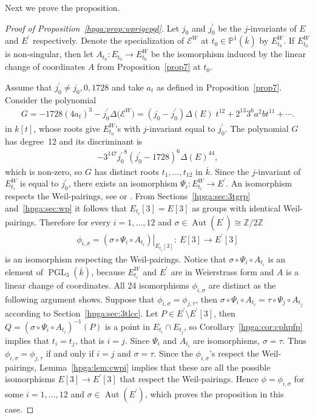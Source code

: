 \documentclass[pdftex]{sigma}
\newcommand{\mpp}{{\mathbb{P}}}
\newcommand{\mzz}{{\mathbb{Z}}}
\newcommand{\msetp}[1]{{\left({#1}\right)}}					%
\newcommand{\msets}[1]{{\left[{#1}\right]}}					%
\newcommand{\maut}[1]{\operatorname{Aut}\msetp{#1}}			%
\newcommand{\mac}[1]{{\overline{#1}}}
\newcommand{\mpgl}[2]{{\operatorname{PGL}_{#1}}\msetp{#2}}	%
\newcommand{\mps}[2]{{\mpp^{#1}\msetp{#2}}}						%
\newcommand{\mres}[2]{{\left.{#1}\right|_{#2}}}					%
\numberwithin{equation}{section}
\begin{document}
Next we prove the proposition.

\begin{proof}[Proof of Proposition~\ref{hpga:prop:wprigepgl}] Let $j_0$ and $j_0^\prime$ be the $j$-invariants of $E$ and $E^\prime$ respectively. Denote the specialization of $\mathcal{E}^W$ at $t_0\in\mps{1}{\mac {k}}$ by $E_{t_0}^W$. If $E_{t_0}^W$ is non-singular, then let $A_{t_0}\colon E_{t_0} \rightarrow E_{t_0}^W$ be the isomorphism induced by the linear change of coordinates $A$ from Proposition~\ref{prop7} at $t_0$.

Assume that $j_0^\prime\neq j_0,0,1728$ and take $a_t$ as defined in Proposition~\ref{prop7}. Consider the polynomial
\begin{gather*}
G=-1728\msetp{4a_t}^3-j_0^\prime \Delta\big(\mathcal{E}^W\big) =\msetp{j_0-j_0^\prime}\Delta\msetp{E}\;t^{12}+2^{13}3^6a^2b t^{11}+\cdots.
\end{gather*}
in $k\msets{t}$, whose roots give $E_{t_0}^W$'s with $j$-invariant equal to $j_0^\prime$. The polynomial $G$ has degree~12 and its discriminant is
\begin{gather*}
-3^{147}{j_0^\prime}^8\msetp{j_0^\prime-1728}^6\Delta\msetp{E}^{44},
\end{gather*}
which is non-zero, so $G$ has distinct roots $t_1,\ldots,t_{12}$ in $\mac{k}$. Since the $j$-invariant of $E_{t_i}^W$ is equal to $j_0^\prime$, there exists an isomorphism $\Psi_i\colon E_{t_i}^W\rightarrow E^\prime$. An isomorphism respects the Weil-pairings, see \cite[Proposition~III.8.2]{silverman1985} or \cite[Theorem~3.9]{washington2008}. From Sections~\ref{hpga:sec:3tgrp} and~\ref{hpga:sec:wp} it follows that $E_{t_i} \msets{3}=E\msets{3}$ as groups with identical Weil-pairings. Therefore for every $i=1,\ldots,12$ and $\sigma\in\maut{E^\prime}\cong\mzz/2\mzz$
\begin{gather*}
\phi_{i,\sigma} =\mres{\msetp{\sigma\circ\Psi_i\circ A_{t_i}}}{E_{t_i}\msets{3}}\colon \ E\msets{3} \rightarrow E^\prime\msets{3}
\end{gather*}
is an isomorphism respecting the Weil-pairings. Notice that $\sigma\circ\Psi_i \circ A_{t_i}$ is an element of $\mpgl{3}{\mac{k}}$, because $E_{t_i}^W$ and $E^\prime$ are in Weierstrass form and $A$ is a linear change of coordinates. All 24 isomorphisms $\phi_{i,\sigma}$ are distinct as the following argument shows. Suppose that $\phi_{i,\sigma}=\phi_{j,\tau}$, then $\sigma\circ\Psi_i\circ A_{t_i}=\tau\circ\Psi_j\circ A_{t_j}$ according to Section~\ref{hpga:sec:3tlcc}. Let $P\in E^\prime\setminus E^\prime\msets{3}$, then $Q=\msetp{\sigma\circ\Psi_i \circ A_{t_i}}^{-1}\msetp{P}$ is a point in $E_{t_i}\cap E_{t_j}$, so Corollary~\ref{hpga:cor:cphpfp} implies that $t_i=t_j$, that is $i=j$. Since $\Psi_i$ and $A_{t_i}$ are isomorphisms, $\sigma=\tau$. Thus $\phi_{i,\sigma}=\phi_{j,\tau}$ if and only if $i=j$ and $\sigma=\tau$. Since the $\phi_{i,\sigma}$'s respect the Weil-pairings, Lemma~\ref{hpga:lem:cwpi} implies that these are all the possible isomorphisms $E\msets{3}\rightarrow E^\prime\msets{3}$ that respect the Weil-pairings. Hence $\phi=\phi_{i,\sigma}$ for some $i=1,\ldots,12$ and $\sigma\in\maut{E^\prime}$, which proves the proposition in this case.


\end{proof}
\end{document}
